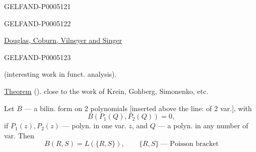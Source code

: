 \begin{GelfandAdjacentEvidence}{GELFAND-P000512}{1}
\end{GelfandAdjacentEvidence}
\begin{GelfandAdjacentEvidence}{GELFAND-P000512}{2}


\qquad{}

\quad
\uline{Douglas, Coburn, Vilneyer and Singer}\quad
{}
\end{GelfandAdjacentEvidence}
\begin{GelfandAdjacentEvidence}{GELFAND-P000512}{3}


(interesting work in funct. analysis).

\uline{Theorem} (). close to the work of Krein, Gohberg, Simonenko, etc.

Let $B$ — a bilin. form on 2 polynomials
[inserted above the line: of 2 var.], with
\[
B(P_1(Q),P_2(Q))=0,
\]
if $P_1(z),P_2(z)$ — polyn. in one var. $z$,
and $Q$ — a polyn. in any number of var. Then
\[
B(R,S)=L(\{R,S\}),\qquad \{R,S\}\ \text{— Poisson bracket}
\]
\end{GelfandAdjacentEvidence}
